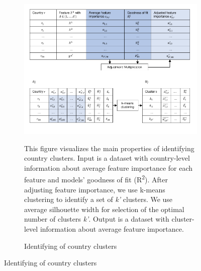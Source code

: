 \begin{figure}[ht!]\ContinuedFloat
   \begin{subfigure}[b]{\textwidth}
  \centering
    \caption{Identifying of country clusters} \label{fig:data_visualisation_3}
  \includegraphics{1_Figures/Figures_Appendix/Graphical representation of data work_3.pdf}
  \begin{subcaption2}
    This figure visualizes the main properties of identifying country clusters. Input is a dataset with country-level information about average feature importance for each feature and models' goodness of fit (R\textsuperscript{2}). After adjusting feature importance, we use k-means clustering to identify a set of \textit{k'} clusters. We use average silhouette width for selection of the optimal number of clusters \textit{k'}. Output is a dataset with cluster-level information about average feature importance.
  \end{subcaption2}
\end{subfigure}
\end{figure}